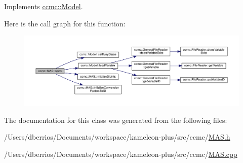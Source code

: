 Implements \hyperlink{classccmc_1_1_model_a3c64dc635c2c1a2fe2f8efa2a3666282}{ccmc\-::\-Model}.



Here is the call graph for this function\-:
\nopagebreak
\begin{figure}[H]
\begin{center}
\leavevmode
\includegraphics[width=350pt]{classccmc_1_1_m_a_s_a054e168c8a692b724471c0c3c775dc25_cgraph}
\end{center}
\end{figure}




The documentation for this class was generated from the following files\-:\begin{DoxyCompactItemize}
\item 
/\-Users/dberrios/\-Documents/workspace/kameleon-\/plus/src/ccmc/\hyperlink{_m_a_s_8h}{M\-A\-S.\-h}\item 
/\-Users/dberrios/\-Documents/workspace/kameleon-\/plus/src/ccmc/\hyperlink{_m_a_s_8cpp}{M\-A\-S.\-cpp}\end{DoxyCompactItemize}
